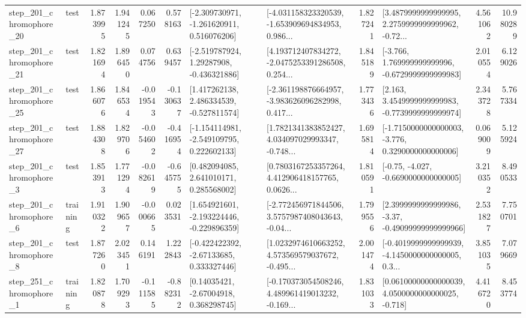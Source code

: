 \begin{tabular}{llrrrrllrlrr}
  step\_201\_chromophore\_20 &      test &      1.873995 &    1.941245 &      0.067250 &  0.578163 &   [-2.309730971, -1.261620911, 0.516076206] &  [-4.031158323320539, -1.653909694834953, 0.986... &       1.827241 &  [3.4879999999999995, 2.2759999999999962, -0.72... &            4.561062 &         10.980289 \\
  step\_201\_chromophore\_21 &      test &      1.821694 &    1.896450 &      0.074756 &  0.639457 &    [-2.519787924, 1.29287908, -0.436321886] &  [4.193712407834272, -2.0475253391286508, 0.254... &       1.845189 &   [-3.766, 1.769999999999996, -0.6729999999999983] &            2.010554 &          6.129026 \\
  step\_201\_chromophore\_25 &      test &      1.866076 &    1.846534 &     -0.019543 & -0.130637 &    [1.417262138, 2.486334539, -0.527811574] &  [-2.361198876664957, -3.983626096282998, 0.417... &       1.773436 &   [2.163, 3.4549999999999983, -0.7739999999999974] &            2.343728 &          5.767334 \\
  step\_201\_chromophore\_27 &      test &      1.884308 &    1.829706 &     -0.054602 & -0.416954 &   [-1.154114981, -2.549109795, 0.222602133] &  [1.7821341383852427, 4.034097029993347, -0.748... &       1.695814 &  [-1.7150000000000003, -3.776, 0.3290000000000006] &            0.069009 &          5.125924 \\
   step\_201\_chromophore\_3 &      test &      1.853913 &    1.771294 &     -0.082619 & -0.645755 &     [0.482094085, 2.641010171, 0.285568002] &  [0.7803167253357264, 4.412906418157765, 0.0626... &       1.810591 &               [-0.75, -4.027, -0.6690000000000005] &            3.210352 &          8.490533 \\
   step\_201\_chromophore\_6 &  training &      1.910322 &    1.909657 &     -0.000665 &  0.023531 &   [1.654921601, -2.193224446, -0.229896359] &  [-2.772456971844506, 3.5757987408043643, -0.04... &       1.799556 &  [2.3999999999999986, -3.37, -0.49099999999999966] &            2.531827 &          7.750701 \\
   step\_201\_chromophore\_8 &      test &      1.877260 &    2.023451 &      0.146191 &  1.222843 &    [-0.422422392, -2.67133685, 0.333327446] &  [1.0232974610663252, 4.573569579037672, -0.495... &       2.001474 &  [-0.4019999999999939, -4.1450000000000005, 0.3... &            3.851035 &          7.079669 \\
   step\_251\_chromophore\_1 &  training &      1.820878 &    1.709293 &     -0.111585 & -0.882312 &      [0.14035421, -2.67004918, 0.368298745] &  [-0.170373054508246, 4.489961419013232, -0.169... &       1.831033 &  [0.06100000000000039, 4.0500000000000025, -0.718] &            4.416720 &          8.453774 \\

\end{tabular}

